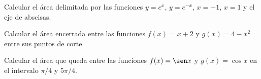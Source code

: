 {Calcular el área delimitada por las funciones $y=e^x$, $y=e^{-x}$, $x=-1$, $x=1$ y el eje de abscisas.
}


{Calcular el área encerrada entre las funciones $f(x)=x+2$ y $g(x)=4-x^2$ entre sus puntos de corte.
}


{Calcular el área que queda entre las funciones $f(x)=\sen x$ y $g(x)=\cos x$ en el intervalo $\pi/4$ y $5\pi/4$.
}